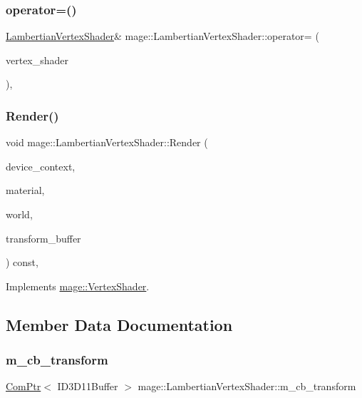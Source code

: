 \subsubsection{\texorpdfstring{operator=()}{operator=()}}
{\footnotesize\ttfamily \hyperlink{classmage_1_1_lambertian_vertex_shader}{Lambertian\+Vertex\+Shader}\& mage\+::\+Lambertian\+Vertex\+Shader\+::operator= (\begin{DoxyParamCaption}\item[{const \hyperlink{classmage_1_1_lambertian_vertex_shader}{Lambertian\+Vertex\+Shader} \&}]{vertex\+\_\+shader }\end{DoxyParamCaption})\hspace{0.3cm}{\ttfamily [private]}, {\ttfamily [delete]}}

\hypertarget{classmage_1_1_lambertian_vertex_shader_a4011d368dfaf7d0202a4cfde052d390a}{}\label{classmage_1_1_lambertian_vertex_shader_a4011d368dfaf7d0202a4cfde052d390a} 
\subsubsection{\texorpdfstring{Render()}{Render()}}
{\footnotesize\ttfamily void mage\+::\+Lambertian\+Vertex\+Shader\+::\+Render (\begin{DoxyParamCaption}\item[{\hyperlink{namespacemage_ae74f374780900893caa5555d1031fd79}{Com\+Ptr}$<$ I\+D3\+D11\+Device\+Context2 $>$}]{device\+\_\+context,  }\item[{const \hyperlink{structmage_1_1_material}{Material} \&}]{material,  }\item[{const \hyperlink{classmage_1_1_world}{World} \&}]{world,  }\item[{const \hyperlink{structmage_1_1_transform_buffer}{Transform\+Buffer} \&}]{transform\+\_\+buffer }\end{DoxyParamCaption}) const\hspace{0.3cm}{\ttfamily [override]}, {\ttfamily [virtual]}}



Implements \hyperlink{classmage_1_1_vertex_shader_acc01e7bdd392d1985bbaaed7cbf40461}{mage\+::\+Vertex\+Shader}.



\subsection{Member Data Documentation}
\hypertarget{classmage_1_1_lambertian_vertex_shader_aae0f2411821315d89eeb982e6c30c22e}{}\label{classmage_1_1_lambertian_vertex_shader_aae0f2411821315d89eeb982e6c30c22e} 
\subsubsection{\texorpdfstring{m\+\_\+cb\+\_\+transform}{m\_cb\_transform}}
{\footnotesize\ttfamily \hyperlink{namespacemage_ae74f374780900893caa5555d1031fd79}{Com\+Ptr}$<$ I\+D3\+D11\+Buffer $>$ mage\+::\+Lambertian\+Vertex\+Shader\+::m\+\_\+cb\+\_\+transform\hspace{0.3cm}{\ttfamily [private]}}

